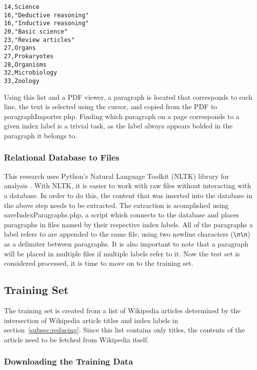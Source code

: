 \begin{multicols}{2}
\begin{verbatim}
14,Science
16,"Deductive reasoning"
16,"Inductive reasoning"
20,"Basic science"
23,"Review articles"
27,Organs
27,Prokaryotes
28,Organisms
32,Microbiology
33,Zoology
\end{verbatim}
\end{multicols}

Using this list and a PDF viewer, a paragraph is located that corresponds to each line, the text is selected using the cursor, and copied from the PDF to paragraphImporter.php.
Finding which paragraph on a page corresponds to a given index label is a trivial task, as the label always appears bolded in the paragraph it belongs to.

\subsubsection{Relational Database to Files}
\label{subsubsec:RDB2F}

This research uses Python's Natural Language Toolkit (NLTK) library for analysis \cite{nltk}.
With NLTK, it is easier to work with raw files without interacting with a database.
In order to do this, the content that was inserted into the database in the above step needs to be extracted.
The extraction is acomplished using saveIndexParagraphs.php, a script which connects to the database and places paragraphs in files named by their respective index labels.
All of the paragraphs a label refers to are appended to the same file, using two newline characters ({\tt{\textbackslash}n{\textbackslash}n}) as a delimiter between paragraphs.
It is also important to note that a paragraph will be placed in multiple files if multiple labels refer to it.
Now the test set is considered processed, it is time to move on to the training set.

\subsection{Training Set}

The training set is created from a list of Wikipedia articles determined by the intersection of Wikipedia article titles and index labels in section~\ref{subsec:reducing}.
Since this list contains only titles, the contents of the article need to be fetched from Wikipedia itself.

\subsubsection{Downloading the Training Data}

